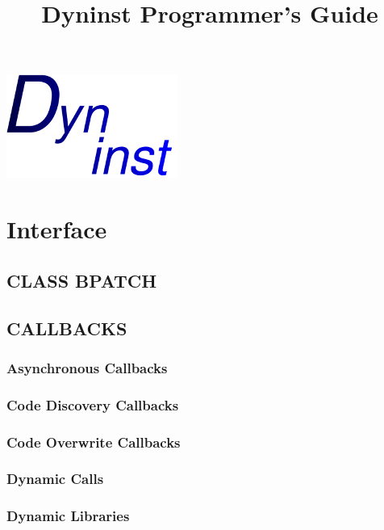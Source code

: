 \documentclass[twopages,a4paper]{article}
\title{Dyninst Programmer's Guide}
\begin{document}
\maketitle

\newlength\tindent
\setlength{\tindent}{\parindent}
\setlength{\parindent}{0pt}
\renewcommand{\indent}{\hspace*{\tindent}}


\includegraphics{logo}

\pagebreak
\tableofcontents

\pagebreak






\section{Interface}
\subsection{CLASS BPATCH}
\subsection{CALLBACKS}
\subsubsection{Asynchronous Callbacks}
\subsubsection{Code Discovery Callbacks}
\subsubsection{Code Overwrite Callbacks}
\subsubsection{Dynamic Calls}
\subsubsection{Dynamic Libraries}
\end{document}
